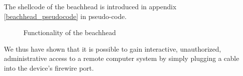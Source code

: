 The shellcode of the beachhead
is introduced in appendix \ref{beachhead_pseudocode} in pseudo-code. 

\begin{figure}[htb] \begin{center}

	\epsfysize 4.5cm


	\caption{Functionality of the beachhead}

	\label{fig:functionality_beachhead}

\end{center}\end{figure}


We thus have shown that it is possible to gain interactive, unauthorized,
administrative access to a remote computer system by simply plugging a cable
into the device's firewire port.

